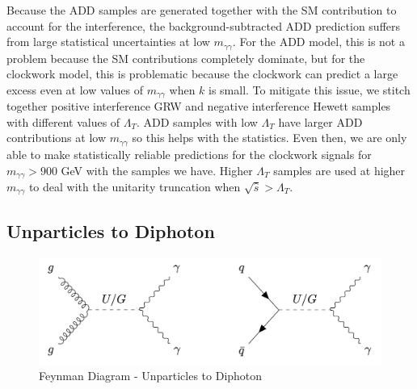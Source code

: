 Because the ADD samples are generated together with the SM contribution to account for the interference, the background-subtracted ADD prediction suffers from large statistical uncertainties at low $m_{\gamma\gamma}$. For the ADD model, this is not a problem because the SM contributions completely dominate, but for the clockwork model, this is problematic because the clockwork can predict a large excess even at low values of $m_{\gamma\gamma}$ when $k$ is small. To mitigate this issue, we stitch together positive interference GRW and negative interference Hewett samples with different values of $\Lambda_{T}$. ADD samples with low $\Lambda_{T}$ have larger ADD contributions at low $m_{\gamma\gamma}$ so this helps with the statistics. Even then, we are only able to make statistically reliable predictions for the clockwork signals for $m_{\gamma\gamma} > 900$ GeV with the samples we have. Higher $\Lambda_{T}$ samples are used at higher $m_{\gamma\gamma}$ to deal with the unitarity truncation when $\sqrt{\hat{s}} > \Lambda_{T}$. 



\subsection{Unparticles to Diphoton}

\begin{figure}[!htbp]
	\centering
    \includegraphics[scale=0.4]{fig/Unparticles_Graviton.png}
	\caption{Feynman Diagram - Unparticles to Diphoton}
	\label{fig:UnparticlesFeynmanDiagram}
\end{figure}

